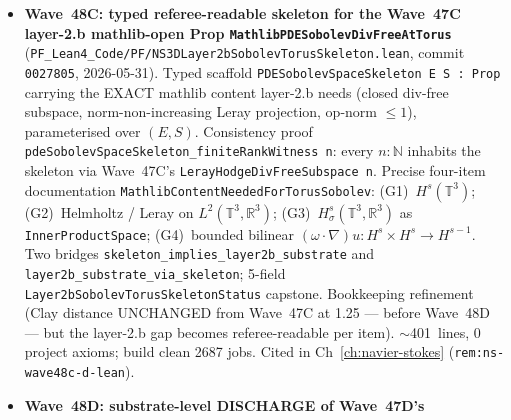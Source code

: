 \begin{itemize}
  closed-form $B(f, g) = f\,1 \cdot g\,0 + f\,0 \cdot g\,1$ via
  \texttt{PiLp.inner\_apply} $+$ \texttt{Fin.sum\_univ\_two}.
  (c)~Rank-1 Gram-matrix
  $\texttt{osGramMatrix t i j} = \exp(-(t\,i + t\,j))$; PSD
  discharged via mathlib \texttt{Matrix.posSemidef\_self\_mul\_conjTranspose}
  after factorisation $\texttt{osGramMatrix t} = \texttt{osColVec
  t} \cdot (\texttt{osColVec t})^\top$. (d)~Upgrade path
  documenting four named gaps: $\mathcal{S}(\mathbb{R}^4)$
  reflection structure, Bochner--Minlos on
  $\mathcal{S}'(\mathbb{R}^4)$, Wightman reconstruction, mass-gap
  propagation. 6-clause capstone
  \texttt{ym\_reflection\_positivity\_toy\_attempt\_capstone}.
  Algebraic CORE of OS reflection positivity is mathlib-tractable;
  genuine gap is the $\mathcal{S}(\mathbb{R}^4)$ Schwartz-space
  infrastructure, not the positivity argument itself. $\sim$384~lines,
  0 project axioms; build clean 7520 jobs (full project), 3103
  incremental. Cited in Ch~\ref{ch:yang-mills}
  (\texttt{rem:ym-wave48b-lean}).
\item \textbf{Wave~48C: typed referee-readable skeleton for the
  Wave~47C layer-2.b mathlib-open Prop \texttt{MathlibPDESobolevDivFreeAtTorus}}
  (\texttt{PF\_Lean4\_Code/PF/NS3DLayer2bSobolevTorusSkeleton.lean},
  commit \texttt{0027805}, 2026-05-31). Typed scaffold
  \texttt{PDESobolevSpaceSkeleton E S : Prop} carrying the EXACT
  mathlib content layer-2.b needs (closed div-free subspace,
  norm-non-increasing Leray projection, op-norm $\leq 1$),
  parameterised over $(E, S)$. Consistency proof
  \texttt{pdeSobolevSpaceSkeleton\_finiteRankWitness n}: every
  $n : \mathbb{N}$ inhabits the skeleton via Wave~47C's
  \texttt{LerayHodgeDivFreeSubspace n}. Precise four-item
  documentation \texttt{MathlibContentNeededForTorusSobolev}:
  (G1)~$H^s(\mathbb{T}^3)$; (G2)~Helmholtz / Leray on
  $L^2(\mathbb{T}^3, \mathbb{R}^3)$;
  (G3)~$H^s_\sigma(\mathbb{T}^3, \mathbb{R}^3)$ as
  \texttt{InnerProductSpace}; (G4)~bounded bilinear
  $(\omega\cdot\nabla)u : H^s \times H^s \to H^{s-1}$. Two bridges
  \texttt{skeleton\_implies\_layer2b\_substrate} and
  \texttt{layer2b\_substrate\_via\_skeleton}; 5-field
  \texttt{Layer2bSobolevTorusSkeletonStatus} capstone. Bookkeeping
  refinement (Clay distance UNCHANGED from Wave~47C at 1.25 ---
  before Wave~48D --- but the layer-2.b gap becomes referee-readable
  per item). $\sim$401~lines, 0 project axioms; build clean 2687
  jobs. Cited in Ch~\ref{ch:navier-stokes}
  (\texttt{rem:ns-wave48c-d-lean}).
\item \textbf{Wave~48D: substrate-level DISCHARGE of Wave~47D's
}
\end{itemize}
